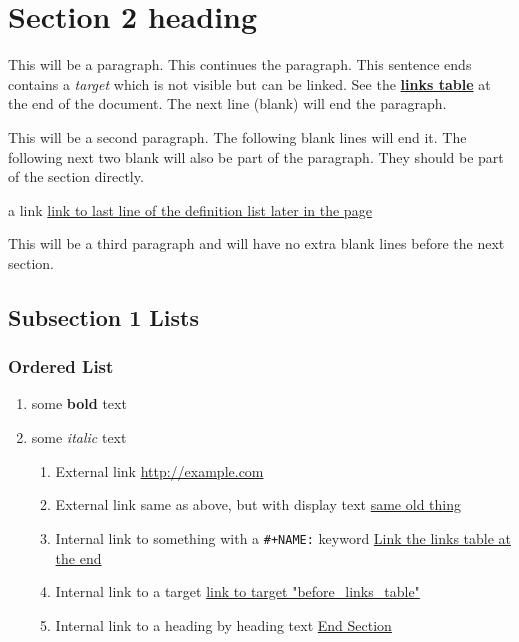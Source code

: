 \documentclass[11pt]{article}
\begin{document}
\section{Section 2 heading  }
 \label{obj-42}
 \label{obj-41}
\begin{quote}
\end{quote}

This will be a paragraph.
This continues the paragraph. This sentence ends contains a
\emph{target}
\label{obj-50} 
which is not visible but can be linked. See the
\hyperref[obj-385]{\textbf{links table}}
at the end of the document.  The next line (blank) will end the
paragraph.

This will be a second paragraph. 
The following blank lines will end it.
The following next two blank will also be part of the paragraph.
They should be part of the section directly.

a link
\hyperref[obj-164]{link to last line of the definition list later in the page}

\vspace{\baselineskip}
This will be a third paragraph and will have no extra blank lines before the next section.

\subsection{Subsection 1 Lists  }
 \label{obj-69}
 \label{obj-68}
\subsubsection{Ordered List  }
 \label{obj-72}
 \label{obj-71}

\begin{enumerate} \label{obj-75}
\item
some
\textbf{bold}
text
\item
some
\emph{italic}
text
\begin{enumerate}
\item
External link
\href{http://example.com}{http://example.com}
\item
External link same as above, but with display text
\href{http://example.com}{same old thing}
\item
Internal link to something with a
\texttt{\#+NAME:}
keyword
\hyperref[obj-385]{Link the links table at the end}
\item
Internal link to a target
\hyperref[obj-384]{link to target "before\_links\_table"}
\item
Internal link to a heading by heading text
\hyperref[obj-381]{End Section}
\end{enumerate}
\end{enumerate}
\end{document}
